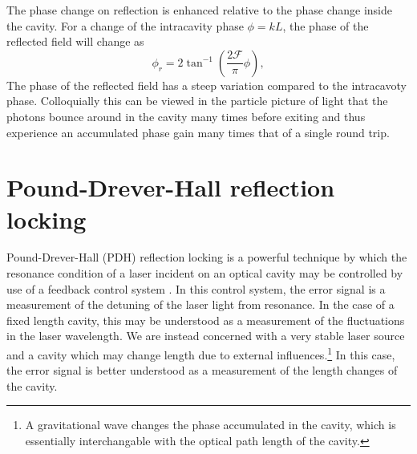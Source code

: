 The phase change on reflection is enhanced relative to the phase change inside the cavity. %
For a change of the intracavity phase $\phi = k L$, the phase of the reflected field will change as
\begin{equation}
\phi_r=2\tan^{-1}\left(\frac{2\mathcal{F}}{\pi}\phi\right),
\end{equation}
 The phase of the reflected field has a steep variation compared to the intracavoty phase. Colloquially this can be viewed in the particle picture of light that the photons bounce around in the cavity many times before exiting and thus experience an accumulated phase gain many times that of a single round trip.

\section{Pound-Drever-Hall reflection locking}
Pound-Drever-Hall (PDH) reflection locking is a powerful technique by which the resonance condition of a laser incident on an optical cavity may be controlled by use of a feedback control system \cite{PDH}. %
In this control system, the error signal is a measurement of the detuning of the laser light from resonance. %
In the case of a fixed length cavity, this may be understood as a measurement of the fluctuations in the laser wavelength. %
We are instead concerned with a very stable laser source and a cavity which may change length due to external influences.\footnote{A gravitational wave changes the phase accumulated in the cavity, which is essentially interchangable with the optical path length of the cavity.} In this case, the error signal is better understood as a measurement of the length changes of the cavity.

